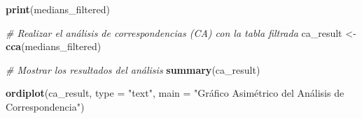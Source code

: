 \documentclass[
]{article}
\newenvironment{Shaded}{\begin{snugshade}}{\end{snugshade}}
\newcommand{\AttributeTok}[1]{\textcolor[rgb]{0.13,0.29,0.53}{#1}}
\newcommand{\CommentTok}[1]{\textcolor[rgb]{0.56,0.35,0.01}{\textit{#1}}}
\newcommand{\FunctionTok}[1]{\textcolor[rgb]{0.13,0.29,0.53}{\textbf{#1}}}
\newcommand{\NormalTok}[1]{#1}
\newcommand{\OtherTok}[1]{\textcolor[rgb]{0.56,0.35,0.01}{#1}}
\newcommand{\StringTok}[1]{\textcolor[rgb]{0.31,0.60,0.02}{#1}}
\begin{document}
\begin{Shaded}
\begin{Highlighting}[]
\FunctionTok{print}\NormalTok{(medians\_filtered)}

\CommentTok{\# Realizar el análisis de correspondencias (CA) con la tabla filtrada}
\NormalTok{ca\_result }\OtherTok{\textless{}{-}} \FunctionTok{cca}\NormalTok{(medians\_filtered)}

\CommentTok{\# Mostrar los resultados del análisis}
\FunctionTok{summary}\NormalTok{(ca\_result)}

\FunctionTok{ordiplot}\NormalTok{(ca\_result, }\AttributeTok{type =} \StringTok{"text"}\NormalTok{, }\AttributeTok{main =} \StringTok{"Gráfico Asimétrico del Análisis de Correspondencia"}\NormalTok{)}
\end{Highlighting}
\end{Shaded}
\end{document}
